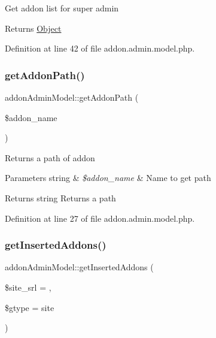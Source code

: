 Get addon list for super admin

\begin{DoxyReturn}{Returns}
\hyperlink{classObject}{Object} 
\end{DoxyReturn}


Definition at line 42 of file addon.\+admin.\+model.\+php.

\mbox{\label{classaddonAdminModel_ab4fea679a0059be718e449b31a88c46f}} 
\subsubsection{\texorpdfstring{get\+Addon\+Path()}{getAddonPath()}}
{\footnotesize\ttfamily addon\+Admin\+Model\+::get\+Addon\+Path (\begin{DoxyParamCaption}\item[{}]{\$addon\+\_\+name }\end{DoxyParamCaption})}

Returns a path of addon


\begin{DoxyParams}[1]{Parameters}
string & {\em \$addon\+\_\+name} & Name to get path \\
\hline
\end{DoxyParams}
\begin{DoxyReturn}{Returns}
string Returns a path 
\end{DoxyReturn}


Definition at line 27 of file addon.\+admin.\+model.\+php.

\mbox{\label{classaddonAdminModel_a3887ceb3d0d09c833df26669d2ce4f96}} 
\subsubsection{\texorpdfstring{get\+Inserted\+Addons()}{getInsertedAddons()}}
{\footnotesize\ttfamily addon\+Admin\+Model\+::get\+Inserted\+Addons (\begin{DoxyParamCaption}\item[{}]{\$site\+\_\+srl = {},  }\item[{}]{\$gtype = {\ttfamily \textquotesingle{}site\textquotesingle{}} }\end{DoxyParamCaption})}

